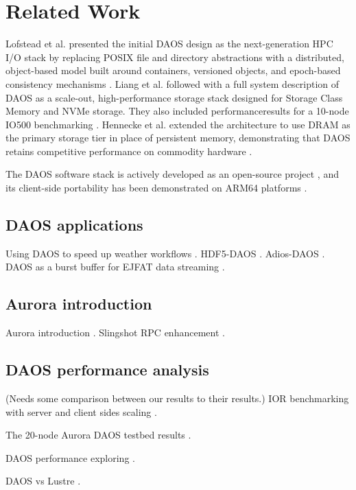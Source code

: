 \section{Related Work}
Lofstead et al. presented the initial DAOS design as the next-generation HPC I/O stack by replacing POSIX file and directory abstractions with a distributed, object-based model built around containers, versioned objects, and epoch-based consistency mechanisms \cite{daos-exascale-storage2016sc}.
Liang et al. followed with a full system description of DAOS as a scale-out, high-performance storage stack designed for Storage Class Memory and NVMe storage. They also included performanceresults for a 10-node IO500 benchmarking \cite{daos-intro2020}. 
Hennecke et al. extended the architecture to use DRAM as the primary storage tier in place of persistent memory, demonstrating that DAOS retains competitive performance on commodity hardware \cite{daos-dram-intro2023}.



The DAOS software stack is actively developed as an open-source project \cite{daos-repo}, and its client-side portability has been demonstrated on ARM64 platforms \cite{daos-arm2023SCAsia}.

\subsection{DAOS applications}
Using DAOS to speed up weather workflows \cite{daos2024weather_flow}. HDF5-DAOS \cite{hdf5-daos2022tpds}. Adios-DAOS \cite{daos-adios2024ISC}. DAOS as a burst buffer for EJFAT data streaming \cite{mei2024sc-poster}.

\subsection{Aurora introduction}
Aurora introduction \cite{aurora-intro2025}. Slingshot RPC enhancement \cite{aurora-daos-slingshot-rpc2025cug}.

\subsection{DAOS performance analysis}
{
\color{blue}
(Needs some comparison between our results to their results.)
}
IOR benchmarking with server and client sides scaling \cite{daos-scalability2023SCAsia}.

The 20-node Aurora DAOS testbed results \cite{DAOS-aurora-20-node-test2024SC-W}. 

DAOS performance exploring \cite{daos-perf-explore2024SC-W}.

DAOS vs Lustre \cite{daos-vs-lustre2022pdsw}.
